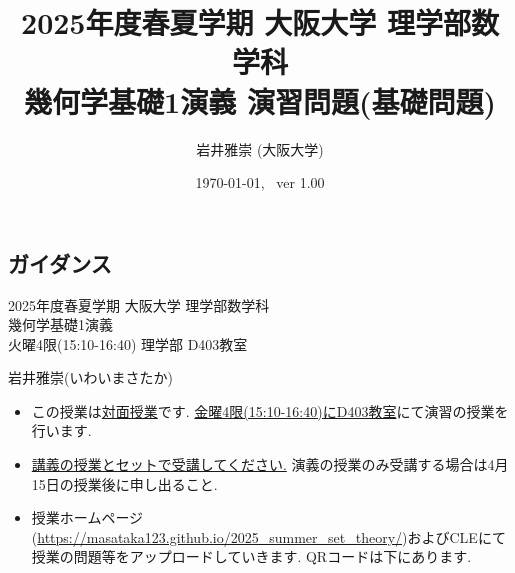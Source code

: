 \documentclass[dvipdfmx,a4paper,11pt]{article}
\title{2025年度春夏学期 大阪大学 理学部数学科 \\ 幾何学基礎1演義 演習問題(基礎問題)}
\author{岩井雅崇 (大阪大学)}
\date{\today, \, ver 1.00}
\theoremstyle{definition}
\begin{document}
\maketitle
\tableofcontents
\newpage

\begin{center}
\setcounter{section}{-1}
\section{ガイダンス}
\label{sec-guide}
\end{center}

\begin{center}
{\Large 2025年度春夏学期 大阪大学 理学部数学科 \\ 幾何学基礎1演義} \\
火曜4限(15:10-16:40) 理学部 D403教室
\end{center}
\begin{flushright}
 岩井雅崇(いわいまさたか) \\
\end{flushright}

\begin{itemize}
  \setlength{\parskip}{0cm} %
  \setlength{\itemsep}{0cm} %
\item この授業は\underline{対面授業}です. \underline{金曜4限(15:10-16:40)にD403教室}にて演習の授業を行います.
\item \underline{講義の授業とセットで受講してください.} 演義の授業のみ受講する場合は4月15日の授業後に申し出ること. 
\item 授業ホームページ(\url{https://masataka123.github.io/2025_summer_set_theory/})およびCLEにて授業の問題等をアップロードしていきます. 
QRコードは下にあります. 
\end{itemize}
\end{document}
